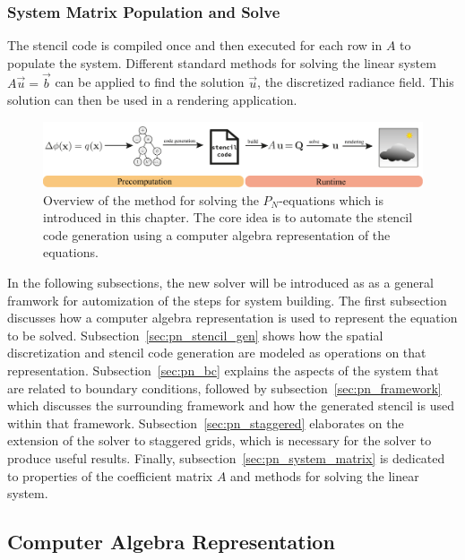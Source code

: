 \subsubsection*{System Matrix Population and Solve}
The stencil code is compiled once and then executed for each row in $A$ to populate the system. Different standard methods for solving the linear system $A\vec{u}=\vec{b}$ can be applied to find the solution $\vec{u}$, the discretized radiance field. This solution can then be used in a rendering application.
\begin{figure}[h]
\centering
\includegraphics[width=1.0\textwidth]{04_pn_method/figures/fig_pipeline.pdf}
\caption{Overview of the method for solving the $P_N$-equations which is introduced in this chapter. The core idea is to automate the stencil code generation using a computer algebra representation of the equations.}
\label{fig:pn_solver_stencil_overview}
\end{figure}

In the following subsections, the new solver will be introduced as as a general framwork for automization of the steps for system building. The first subsection discusses how a computer algebra representation is used to represent the equation to be solved. Subsection~\ref{sec:pn_stencil_gen} shows how the spatial discretization and stencil code generation are modeled as operations on that representation. Subsection~\ref{sec:pn_bc} explains the aspects of the system that are related to boundary conditions, followed by subsection~\ref{sec:pn_framework} which discusses the surrounding framework and how the generated stencil is used within that framework. Subsection~\ref{sec:pn_staggered} elaborates on the extension of the solver to staggered grids, which is necessary for the solver to produce useful results. Finally, subsection~\ref{sec:pn_system_matrix} is dedicated to properties of the coefficient matrix $A$ and methods for solving the linear system.

\subsection{Computer Algebra Representation}
\label{sec:pn_car}

